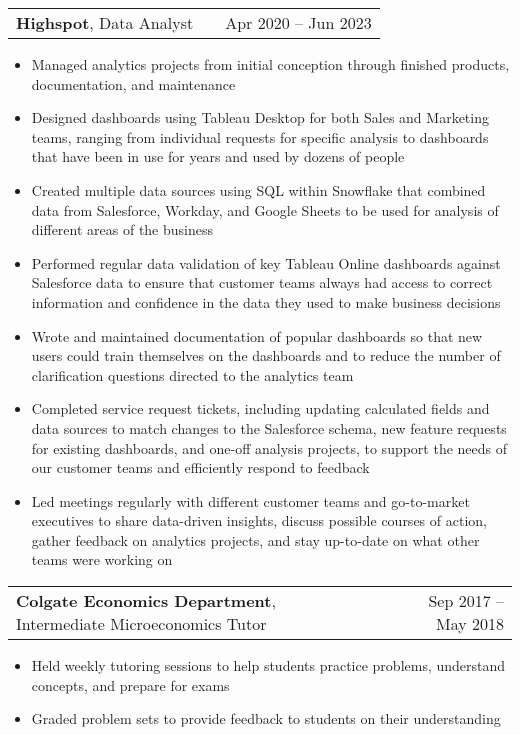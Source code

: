 \documentclass[a4paper,12pt]{article}
\makeatletter
\newenvironment{joblong}[2]
    {
    \begin{tabularx}{\linewidth}{@{}l X r@{}}
    #1 & \hfill &  #2 \\[3.75pt]
    \end{tabularx}
    \begin{minipage}[t]{\linewidth}
    \begin{itemize}[nosep,after=\strut, leftmargin=1em, itemsep=3pt,label=--]
    }
    {
    \end{itemize}
    \end{minipage}    
    }
\makeatother
\begin{document}
\begin{joblong}{\textbf{Highspot}, Data Analyst}{Apr 2020 -- Jun 2023}
\item Managed analytics projects from initial conception through finished products, documentation, and maintenance
\item Designed dashboards using Tableau Desktop for both Sales and Marketing teams, ranging from individual requests for specific analysis to dashboards that have been in use for years and used by dozens of people
\item Created multiple data sources using SQL within Snowflake that combined data from Salesforce, Workday, and Google Sheets to be used for analysis of different areas of the business
\item Performed regular data validation of key Tableau Online dashboards against Salesforce data to ensure that customer teams always had access to correct information and confidence in the data they used to make business decisions
\item Wrote and maintained documentation of popular dashboards so that new users could train themselves on the dashboards and to reduce the number of clarification questions directed to the analytics team
\item Completed service request tickets, including updating calculated fields and data sources to match changes to the Salesforce schema, new feature requests for existing dashboards, and one-off analysis projects, to support the needs of our customer teams and efficiently respond to feedback
\item Led meetings regularly with different customer teams and go-to-market executives to share data-driven insights, discuss possible courses of action, gather feedback on analytics projects, and stay up-to-date on what other teams were working on
\end{joblong}

\begin{joblong}{\textbf{Colgate Economics Department}, Intermediate Microeconomics Tutor}{Sep 2017 -- May 2018}
\item Held weekly tutoring sessions to help students practice problems, understand concepts, and prepare for exams
\item Graded problem sets to provide feedback to students on their understanding
\end{joblong}

\end{document}
